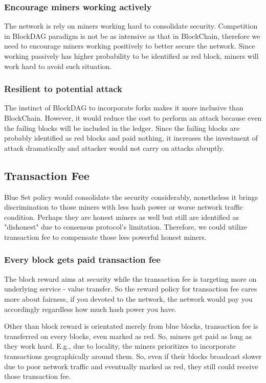 \documentclass[a4paper,11pt]{article}
\begin{document}
\subsubsection*{Encourage miners working actively}
The network is rely on miners working hard to consolidate security. Competition in BlockDAG paradigm is not be as intensive as that in BlockChain, therefore we need to encourage miners working positively to better secure the network. Since working passively has higher probability to be identified as red block, miners will work hard to avoid such situation.

\subsubsection*{Resilient to potential attack}
The instinct of BlockDAG to incorporate forks makes it more inclusive than BlockChain. However, it would reduce the cost to perform an attack because even the failing blocks will be included in the ledger. Since the failing blocks are probably identified as red blocks and paid nothing, it increases the investment of attack dramatically and attacker would not carry on attacks abruptly.

\subsection{Transaction Fee}
Blue Set policy would consolidate the security considerably, nonetheless it brings discrimination to those miners with less hash power or worse network traffic condition. Perhaps they are honest miners as well but still are identified as "dishonest" due to consensus protocol's limitation. Therefore, we could utilize transaction fee to compensate those less powerful honest miners. 

\subsubsection{Every block gets paid transaction fee}
The block reward aims at security while the transaction fee is targeting more on underlying service - value transfer. So the reward policy for transaction fee cares more about fairness, if you devoted to the network, the network would pay you accordingly regardless how much hash power you have.

Other than block reward is orientated merely from  blue blocks, transaction fee is transferred on every blocks, even marked as red. So, miners get paid as long as they work hard. E.g., due to locality, the miners prioritizes to incorporate transactions geographically around them. So, even if their blocks broadcast slower due to poor network traffic and eventually marked as red, they still could receive those transaction fee.
\end{document}
